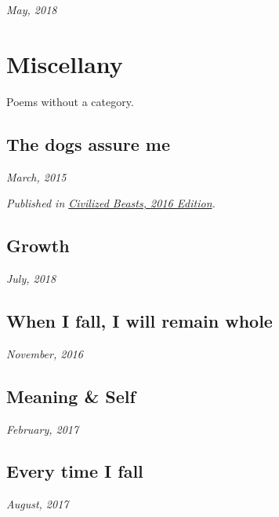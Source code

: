 \documentclass[10pt]{memoir}
\begin{document}
  \hfill\textit{May, 2018}
  \newpage

  
  \newpage


  \chapter{Miscellany}

  Poems without a category.
  \thispagestyle{empty}
  \newpage


  \section{The dogs assure me}

  \hfill\textit{March, 2015}

  

  \textit{Published in \underline{Civilized Beasts, 2016 Edition}.}
  \cleartoverso


  \section{Growth}

  \hfill\textit{July, 2018}

  
  \newpage


  \section{When I fall, I will remain whole}

  \hfill\textit{November, 2016}

  
  \cleartoverso


  \section{Meaning \& Self}

  \hfill\textit{February, 2017}

  
  \newpage

  \section{Every time I fall}

  \hfill\textit{August, 2017}

  
  \newpage
\end{document}
